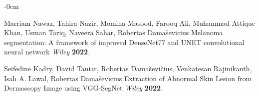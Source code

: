 \documentclass[sensors,article,submit,pdftex,moreauthors]{Definitions/mdpi}
\begin{document}
\begin{adjustwidth}{-\extralength}{0cm}
\begin{thebibliography}{999}
			Marriam Nawaz, Tahira Nazir, Momina Masood, Farooq Ali, 
			Muhammad Attique Khan, Usman Tariq, Naveera Sahar,
			Robertas Damaševicius Melanoma segmentation: A framework of improved
			DenseNet77 and UNET convolutional neural network
			{\em Wiley} 
			{\bf 2022}.
			
			Seifedine Kadry, David Taniar, Robertas Damaševičius, Venkatesan Rajinikanth, Isah A. Lawal,
			Robertas Damaševicius Extraction of Abnormal Skin Lesion from
			Dermoscopy Image using VGG-SegNet
			{\em Wiley} 
			{\bf 2022}.
		\end{thebibliography}
		
		
		
	\end{adjustwidth}
	
\end{document}

